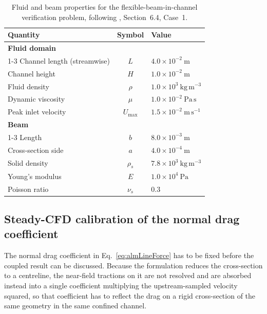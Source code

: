 \begin{table}[!ht]
\centering
\small
\caption{Fluid and beam properties for the flexible-beam-in-channel verification problem, following \citet{zhang_immersed_2012}, Section~6.4, Case~1.}
\label{tab:beamtunnel_properties}
\setlength{\tabcolsep}{6pt}
\renewcommand{\arraystretch}{1.15}
\begin{tabularx}{\linewidth}{l c X}
\toprule
Quantity & Symbol & Value \\
\midrule
\multicolumn{3}{l}{\textbf{Fluid domain}} \\
\cmidrule(lr){1-3}
Channel length (streamwise)      & $L$    & $4.0\times10^{-2}~\mathrm{m}$ \\
Channel height                   & $H$    & $1.0\times10^{-2}~\mathrm{m}$ \\
Fluid density                    & $\rho$ & $1.0\times10^{3}~\mathrm{kg\,m^{-3}}$ \\
Dynamic viscosity                & $\mu$  & $1.0\times10^{-2}~\mathrm{Pa\,s}$ \\
Peak inlet velocity              & $U_{\max}$ & $1.5\times10^{-2}~\mathrm{m\,s^{-1}}$ \\
\midrule
\multicolumn{3}{l}{\textbf{Beam}} \\
\cmidrule(lr){1-3}
Length                           & $b$        & $8.0\times10^{-3}~\mathrm{m}$ \\
Cross-section side               & $a$        & $4.0\times10^{-4}~\mathrm{m}$ \\
Solid density                    & $\rho_s$   & $7.8\times10^{3}~\mathrm{kg\,m^{-3}}$ \\
Young's modulus                  & $E$        & $1.0\times10^{4}~\mathrm{Pa}$ \\
Poisson ratio                    & $\nu_s$    & $0.3$ \\
\bottomrule
\end{tabularx}
\end{table}

\subsection{Steady-CFD calibration of the normal drag coefficient}
\label{sec:beamtunnel_cd_calibration}

\noindent
The normal drag coefficient in Eq.~\eqref{eq:almLineForce} has to be fixed before the coupled result can be discussed. Because the formulation reduces the cross-section to a centreline, the near-field tractions on it are not resolved and are absorbed instead into a single coefficient multiplying the upstream-sampled velocity squared, so that coefficient has to reflect the drag on a rigid cross-section of the same geometry in the same confined channel.

